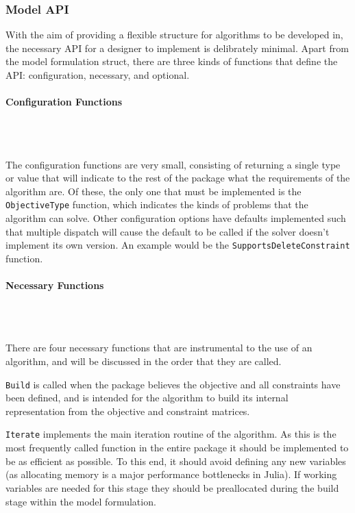 \subsubsection{Model API}
With the aim of providing a flexible structure for algorithms to be developed in, the necessary API for a designer to implement is delibrately minimal. Apart from the model formulation struct, there are three kinds of functions that define the API: configuration, necessary, and optional.

\paragraph{Configuration Functions}\\\

The configuration functions are very small, consisting of returning a single type or value that will indicate to the rest of the package what the requirements of the algorithm are. Of these, the only one that must be implemented is the \texttt{ObjectiveType} function, which indicates the kinds of problems that the algorithm can solve. Other configuration options have defaults implemented such that multiple dispatch will cause the default to be called if the solver doesn't implement its own version. An example would be the \texttt{SupportsDeleteConstraint} function. 

\paragraph{Necessary Functions}\\\

There are four necessary functions that are instrumental to the use of an algorithm, and will be discussed in the order that they are called. 

\texttt{Build} is called when the package believes the objective and all constraints have been defined, and is intended for the algorithm to build its internal representation from the objective and constraint matrices. 

\texttt{Iterate} implements the main iteration routine of the algorithm. As this is the most frequently called function in the entire package it should be implemented to be as efficient as possible. To this end, it should avoid defining any new variables (as allocating memory is a major performance bottlenecks in Julia). If working variables are needed for this stage they should be preallocated during the build stage within the model formulation. 

